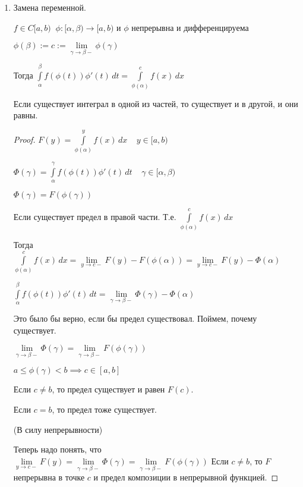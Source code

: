 \begin{properties}
\begin{enumerate}
\begin{proof}
			$\implies \int\limits_a^b fg' = fg \Big|_a^b - \int\limits_a^b f'g$
			
			при существовании $ \lim\limits_{c \to b-} f(c)\cdot g(c)$ и $\int\limits_a^b f'g$, что есть в условии.
			
		\end{proof}
		
		\item Замена переменной.
		
		$f \in C[a,b)\;\; \phi :[\alpha,\beta) \to [a,b) $  и $\phi$ непрерывна и дифференцируема
		
		$\phi{(\beta)} := c := \lim\limits_{\gamma \to \beta-} \phi(\gamma)$
		
		Тогда $\int\limits_{\alpha}^{\beta} f(\phi(t))\phi'(t) \, dt = \int\limits_{\phi{(\alpha)}}^{c} f(x) \, dx$
		
		Если существует интеграл в одной из частей, то существует и в другой, и они равны.
		
		\begin{proof}\slashns
			
			$F(y) = \int\limits_{\phi{(\alpha)}}^{y} f(x) \, dx\;\;\;\; y\in [a,b)$
			
			$\Phi(\gamma) = \int\limits_{\alpha}^{\gamma} f(\phi(t))\phi'(t) \, dt\;\;\;\; \gamma \in [\alpha, \beta)$
			
			$\Phi(\gamma) = F(\phi(\gamma))$
			
			Если существует предел в правой части. Т.е. $ \int\limits_{\phi{(\alpha)}}^{c} f(x) \, dx$
			
			Тогда $\int\limits_{\phi{(\alpha)}}^{c} f(x) \, dx = \lim\limits_{y \to c-}F(y) - F(\phi(\alpha)) = \lim\limits_{y \to c-}F(y) - \Phi(\alpha)$
			
			$\int\limits_{\alpha}^{\beta}f(\phi(t))\phi'(t) \, dt = \lim\limits_{\gamma \to \beta-} \Phi(\gamma) - \Phi(\alpha)$
			
			Это было бы верно, если бы предел существовал. Поймем, почему существует.
			
			$\lim\limits_{\gamma \to \beta-} \Phi(\gamma) = \lim\limits_{\gamma \to \beta-} F(\phi(\gamma))$
			
			$a \le \phi(\gamma) < b \implies c \in [a,b]$
			
			Если $c \ne b$, то предел существует и равен $F(c)$.
			
			Если $c = b$, то предел тоже существует.
			
			(В силу непрерывности)
			
			Теперь надо понять, что $ \lim\limits_{y \to c-} F(y) = \lim\limits_{\gamma \to \beta-} \Phi(\gamma) = \lim\limits_{\gamma \to \beta-} F(\phi(\gamma))$
			Если $c\ne b$, то $F$ непрерывна в точке $c$ и предел композиции в непрерывной функцией.
			

\end{proof}
\end{enumerate}
\end{properties}
